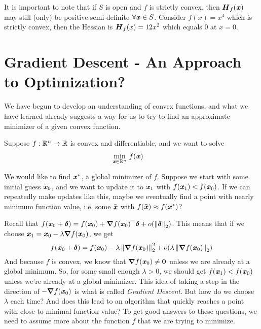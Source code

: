 \begin{remark}
It is important to note that if $S$ is open and $f$ is strictly
convex, then $\boldsymbol{{H}}_{f}(\boldsymbol{\mathit{x}})$ may still (only) be positive semi-definite
$\forall \boldsymbol{\mathit{x}} \in S$. Consider $f(x) = x^4$ which is strictly convex,
then the Hessian is $\boldsymbol{{H}}_{f}(x) = 12x^2$ which equals 0 at $x = 0$.
\end{remark}

\section{Gradient Descent - An Approach to Optimization?}

We have begun to develop an understanding of convex functions, and
what we have learned already suggests a way for us to try to find an
approximate minimizer of a given convex function.

Suppose $f : \mathbb{R}^n \to \mathbb{R}$ is convex and differentiable, and we want to
solve
\begin{align*}
\min_{\boldsymbol{\mathit{x}} \in \mathbb{R}^n} & \ f(\boldsymbol{\mathit{x}})
\end{align*}

We would like to find $\boldsymbol{\mathit{x}}^*$, a global minimizer of $f$.
Suppose we start with some initial guess  $\boldsymbol{\mathit{x}}_0$,
and we want to update it to $\boldsymbol{\mathit{x}}_1$ with $f(\boldsymbol{\mathit{x}}_1) < f(\boldsymbol{\mathit{x}}_0)$.
If we can repeatedly make updates like this, maybe we eventually
find a point with nearly minimum function value, i.e. some $\boldsymbol{\tilde{\mathit{x}}}$ with $f(\boldsymbol{\tilde{\mathit{x}}}) \approx f(\boldsymbol{\mathit{x}}^*)$?

Recall that $f(\boldsymbol{\mathit{x}}_0+\boldsymbol{\delta}) = f(\boldsymbol{\mathit{x}}_0) + \boldsymbol{\nabla} f(\boldsymbol{\mathit{x}}_0)^\top\boldsymbol{\delta} +
o(\left\| \boldsymbol{\delta} \right\|_2)$.
This means that if we choose
${\boldsymbol{\mathit{x}}_1 = \boldsymbol{\mathit{x}}_0 - \lambda \boldsymbol{\nabla} f(\boldsymbol{\mathit{x}}_0)}$, we get
\[
  f(\boldsymbol{\mathit{x}}_0+\boldsymbol{\delta}) =
  f(\boldsymbol{\mathit{x}}_0) -\lambda \left\| \boldsymbol{\nabla} f(\boldsymbol{\mathit{x}}_0) \right\|_2^2 + o(\lambda \left\| \boldsymbol{\nabla} f(\boldsymbol{\mathit{x}}_0) \right\|_2)
\]
And because $f$ is convex, we know that $\boldsymbol{\nabla} f(\boldsymbol{\mathit{x}}_0) \neq \boldsymbol{0}$
unless we are already at a global minimum.
So, for some small enough $\lambda > 0$, we should get $f(\boldsymbol{\mathit{x}}_1) <
f(\boldsymbol{\mathit{x}}_0)$ unless we're already at a global minimizer.
This idea of taking a step in the direction of $-\boldsymbol{\nabla} f(\boldsymbol{\mathit{x}}_0)$ is
what is called \emph{Gradient Descent}.
But how do we choose $\lambda$ each time? And
does this lead to an algorithm that quickly reaches a point with close to minimal function value?
To get good answers to these questions, we need to assume more about
the function $f$ that we are trying to minimize.

